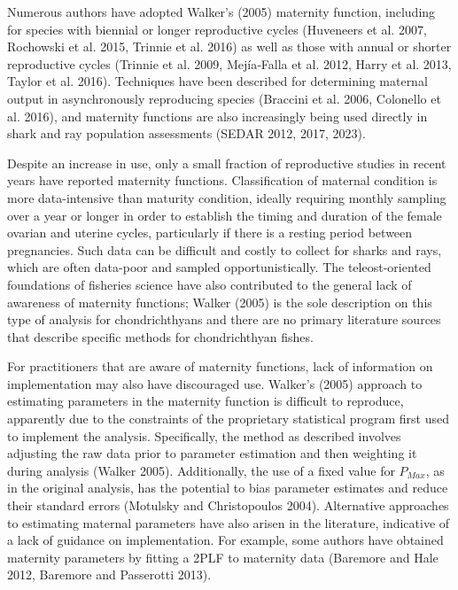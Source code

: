 \documentclass[
]{article}
\begin{document}
Numerous authors have adopted Walker's (2005) maternity function, including for species with biennial or longer reproductive cycles (Huveneers et al. 2007, Rochowski et al. 2015, Trinnie et al. 2016) as well as those with annual or shorter reproductive cycles (Trinnie et al. 2009, Mejía‐Falla et al. 2012, Harry et al. 2013, Taylor et al. 2016). Techniques have been described for determining maternal output in asynchronously reproducing species (Braccini et al. 2006, Colonello et al. 2016), and maternity functions are also increasingly being used directly in shark and ray population assessments (SEDAR 2012, 2017, 2023).

Despite an increase in use, only a small fraction of reproductive studies in recent years have reported maternity functions. Classification of maternal condition is more data-intensive than maturity condition, ideally requiring monthly sampling over a year or longer in order to establish the timing and duration of the female ovarian and uterine cycles, particularly if there is a resting period between pregnancies. Such data can be difficult and costly to collect for sharks and rays, which are often data-poor and sampled opportunistically. The teleost-oriented foundations of fisheries science have also contributed to the general lack of awareness of maternity functions; Walker (2005) is the sole description on this type of analysis for chondrichthyans and there are no primary literature sources that describe specific methods for chondrichthyan fishes.

For practitioners that are aware of maternity functions, lack of information on implementation may also have discouraged use. Walker's (2005) approach to estimating parameters in the maternity function is difficult to reproduce, apparently due to the constraints of the proprietary statistical program first used to implement the analysis. Specifically, the method as described involves adjusting the raw data prior to parameter estimation and then weighting it during analysis (Walker 2005). Additionally, the use of a fixed value for \(P_{Max}\), as in the original analysis, has the potential to bias parameter estimates and reduce their standard errors (Motulsky and Christopoulos 2004). Alternative approaches to estimating maternal parameters have also arisen in the literature, indicative of a lack of guidance on implementation. For example, some authors have obtained maternity parameters by fitting a 2PLF to maternity data (Baremore and Hale 2012, Baremore and Passerotti 2013).
\end{document}
